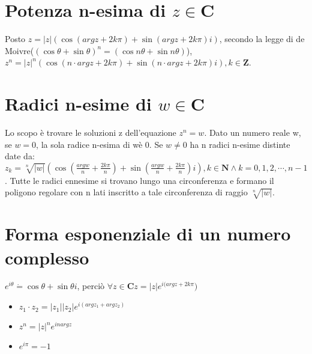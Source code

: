 \section{Potenza n-esima di $z\in\mathbf{C}$}
Posto $z=|z|(\cos(argz +2k\pi)+\sin(argz +2k\pi)i)$, secondo la legge di de Moivre($(\cos\theta+\sin\theta)^n=(\cos n\theta+\sin n\theta)$), $z^n=|z|^n(\cos(n\cdot argz +2k\pi)+\sin(n\cdot argz +2k\pi)i), k\in\mathbf{Z}$.
\section{Radici n-esime di $w\in\mathbf{C}$}
Lo scopo \`e trovare le soluzioni z dell'equazione $z^n=w$. Dato un numero reale w, se $w=0$, la sola radice n-esima di w\`e 0. Se $w\neq 0$ ha n radici n-esime distinte date
da: $z_k=\sqrt[n]{|w|}(\cos(\frac{argw}{n}+\frac{2k\pi}{n})+\sin(\frac{argw}{n}+\frac{2k\pi}{n})i), k\in\mathbf{N}\wedge k=0,1,2,\cdots,n-1$. Tutte le radici ennesime si 
trovano lungo una circonferenza e formano il poligono regolare con n lati inscritto a tale circonferenza di raggio $\sqrt[n]{|w|}$.
\section{Forma esponenziale di un numero complesso}
$e^{i\theta}\dot{=}\cos\theta+\sin\theta i$, perci\`o $\forall z\in\mathbf{C} z=|z|e^{i(argz+2k\pi})$
\begin{itemize}
\item $z_1\cdot z_2=|z_1||z_2|e^{i(argz_1+argz_2)}$
\item $z^n=|z|^ne^{inargz}$
\item $e^{i\pi}=-1$
\end{itemize}
